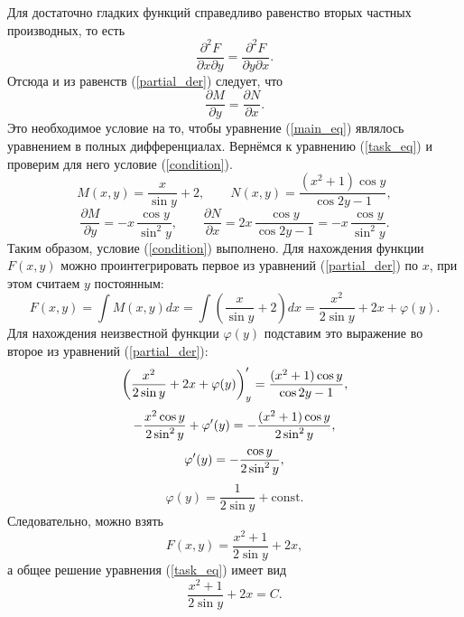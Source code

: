 \documentclass[12pt]{article}
\begin{document}
Для достаточно гладких функций справедливо равенство вторых частных производных, то есть
\begin{equation*}
    \frac{\partial^2F}{\partial x\partial y} = \frac{\partial^2F}{\partial y\partial x}.
\end{equation*}
Отсюда и из равенств (\ref{partial_der}) следует, что
\begin{equation}\label{condition}
    \frac{\partial M}{\partial y} = \frac{\partial N}{\partial x}.
\end{equation}
Это необходимое условие на то, чтобы уравнение (\ref{main_eq}) являлось уравнением в полных дифференциалах. Вернёмся к уравнению (\ref{task_eq}) и проверим для него условие (\ref{condition}).
\begin{equation*}
    M(x,y) = \frac{x}{\sin{y}}+2, \quad\quad N(x,y) = \frac{(x^2+1) \cos{y}}{\cos{2y}-1},
\end{equation*}
\begin{equation*}
    \frac{\partial M}{\partial y} = -x\,\frac{\cos{y}}{\sin^2 y}, \quad\quad \frac{\partial N}{\partial x} = 2x\,\frac{\cos{y}}{\cos{2y}-1} = -x\,\frac{\cos{y}}{\sin^2 y}.
\end{equation*}
\newpage
Таким образом, условие (\ref{condition}) выполнено. Для нахождения функции $F(x,y)$ можно проинтегрировать первое из уравнений (\ref{partial_der}) по $x$, при этом считаем $y$ постоянным:
\begin{equation*}
    F(x,y) = \int M(x,y)dx = \int \left(\frac{x}{\sin{y}}+2\right)dx = \frac{x^2}{2\sin{y}} + 2x + \varphi(y).
\end{equation*}
Для нахождения неизвестной функции $\varphi(y)$ подставим это выражение во второе из уравнений (\ref{partial_der}):
\begin{equation*}
    \left(\frac{x^2}{2\sin{y}} + 2x + \varphi(y)\right)_y' = \frac{(x^2+1) \cos{y}}{\cos{2y}-1},\vspace{3mm}
\end{equation*}
\begin{equation*}
    -\frac{x^2\cos{y}}{2\sin^2 y} + \varphi'(y) = -\frac{(x^2+1)\cos{y}}{2\sin^2 y},\vspace{3mm}
\end{equation*}
\begin{equation*}
    \varphi'(y) = -\frac{\cos{y}}{2\sin^2 y},\vspace{3mm}
\end{equation*}
\begin{equation*}
    \varphi(y) = \frac{1}{2\sin{y}} + \text{const}.
\end{equation*}
Следовательно, можно взять
\begin{equation*}
    F(x,y) = \frac{x^2 + 1}{2\sin{y}} + 2x,
\end{equation*}
а общее решение уравнения (\ref{task_eq}) имеет вид
\begin{equation*}
    \frac{x^2 + 1}{2\sin{y}} + 2x = C.
\end{equation*}
\end{document}
